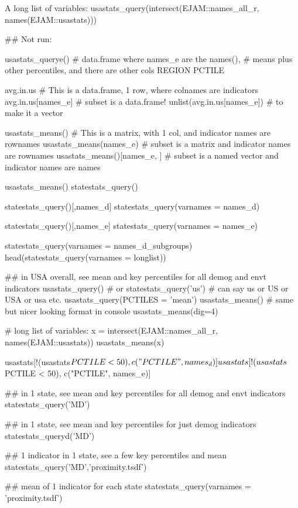 \documentclass[a4paper]{book}
\begin{document}
%
\begin{Details}\relax
A long list of variables: usastats\_query(intersect(EJAM::names\_all\_r,  names(EJAM::usastats)))
\end{Details}
%
\begin{Examples}
\begin{ExampleCode}
## Not run: 

usastats_querye() 
#  data.frame where names_e are the names(), 
#  means plus other percentiles, and there are other cols REGION PCTILE

avg.in.us                # This is a data.frame, 1 row, where colnames are indicators
avg.in.us[names_e]          # subset is a data.frame!
unlist(avg.in.us[names_e])  # to make it a vector

usastats_means()        # This is a matrix, with 1 col, and indicator names are rownames
usastats_means(names_e)     # subset is a matrix        and indicator names are rownames
usastats_means()[names_e, ] # subset is a named vector  and indicator names are  names

usastats_means()
statestats_query()

statestats_query()[,names_d]
statestats_query(varnames = names_d)

statestats_query()[,names_e]
statestats_query(varnames = names_e)

statestats_query(varnames = names_d_subgroups)
head(statestats_query(varnames = longlist))

## in USA overall, see mean and key percentiles for all demog and envt indicators
usastats_query() # or statestats_query('us') # can say us or US or USA or usa etc.
usastats_query(PCTILES = 'mean')
usastats_means() # same but nicer looking format in console
usastats_means(dig=4)

# long list of variables:
x = intersect(EJAM::names_all_r,  names(EJAM::usastats))
usastats_means(x)

usastats[!(usastats$PCTILE < 50), c("PCTILE", names_d)]
usastats[!(usastats$PCTILE < 50), c("PCTILE", names_e)]

## in 1 state, see mean and key percentiles for all demog and envt indicators
statestats_query('MD')

## in 1 state, see mean and key percentiles for just demog indicators
statestats_queryd('MD')

## 1 indicator in 1 state, see a few key percentiles and mean
statestats_query('MD','proximity.tsdf')

## mean of 1 indicator for each state
statestats_query(varnames = 'proximity.tsdf')


\end{ExampleCode}
\end{Examples}
\end{document}
